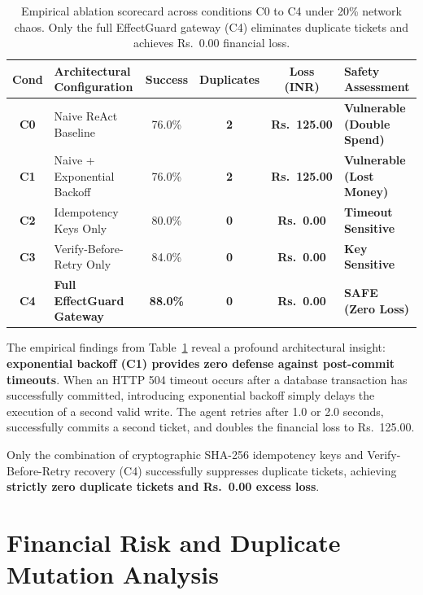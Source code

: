 \begin{table}[H]
\centering
\small
\renewcommand{\arraystretch}{1.25}
\begin{tabular}{|c|p{4.2cm}|c|c|c|p{3.2cm}|}
\hline
\rowcolor{gray!15}
\textbf{Cond} & \textbf{Architectural Configuration} & \textbf{Success} & \textbf{Duplicates} & \textbf{Loss (INR)} & \textbf{Safety Assessment} \\
\hline
\textbf{C0} & Naive ReAct Baseline & 76.0\% & \textbf{2} & \textbf{Rs.~125.00} & \textcolor{red!80!black}{\textbf{Vulnerable (Double Spend)}} \\
\hline
\textbf{C1} & Naive + Exponential Backoff & 76.0\% & \textbf{2} & \textbf{Rs.~125.00} & \textcolor{red!80!black}{\textbf{Vulnerable (Lost Money)}} \\
\hline
\textbf{C2} & Idempotency Keys Only & 80.0\% & \textbf{0} & \textbf{Rs.~0.00} & \textcolor{orange!80!black}{\textbf{Timeout Sensitive}} \\
\hline
\textbf{C3} & Verify-Before-Retry Only & 84.0\% & \textbf{0} & \textbf{Rs.~0.00} & \textcolor{orange!80!black}{\textbf{Key Sensitive}} \\
\hline
\textbf{C4} & \textbf{Full EffectGuard Gateway} & \textbf{88.0\%} & \textbf{0} & \textbf{Rs.~0.00} & \textcolor{green!60!black}{\textbf{SAFE (Zero Loss)}} \\
\hline
\end{tabular}
\caption{Empirical ablation scorecard across conditions C0 to C4 under 20\% network chaos. Only the full EffectGuard gateway (C4) eliminates duplicate tickets and achieves Rs.~0.00 financial loss.}
\label{tab:ablation_scorecard}
\end{table}

The empirical findings from Table~\ref{tab:ablation_scorecard} reveal a profound architectural insight: \textbf{exponential backoff (C1) provides zero defense against post-commit timeouts}. When an HTTP 504 timeout occurs after a database transaction has successfully committed, introducing exponential backoff simply delays the execution of a second valid write. The agent retries after 1.0 or 2.0 seconds, successfully commits a second ticket, and doubles the financial loss to Rs.~125.00. 

Only the combination of cryptographic SHA-256 idempotency keys and Verify-Before-Retry recovery (C4) successfully suppresses duplicate tickets, achieving \textbf{strictly zero duplicate tickets and Rs.~0.00 excess loss}.

\section{Financial Risk and Duplicate Mutation Analysis}

